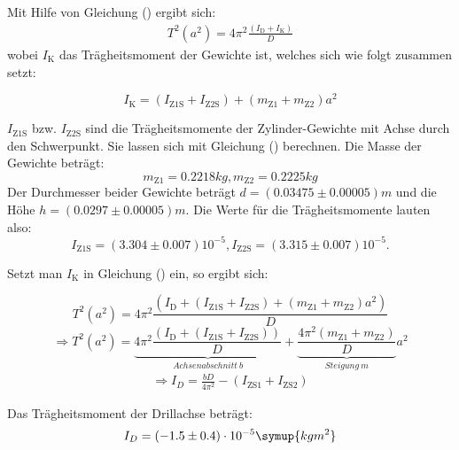 Mit Hilfe von Gleichung () ergibt sich:
\begin{align}
  T^2(a^2) = 4\pi^2\frac{(I_\text{D}+I_\text{K})}{D}
\end{align}
wobei $I_\text{K}$ das Trägheitsmoment der Gewichte ist, welches sich wie folgt zusammen setzt:

\begin{equation}
 I_\text{K} = (I_\text{Z1S}+I_\text{Z2S})+(m_\text{Z1}+m_\text{Z2})a^2
\end{equation}

$I_\text{Z1S}$ bzw. $I_\text{Z2S}$ sind die Trägheitsmomente der Zylinder-Gewichte mit Achse durch den Schwerpunkt.
Sie lassen sich mit Gleichung () berechnen. 
Die Masse der Gewichte beträgt:
\begin{equation}
m_\text{Z1} = 0.2218 kg , m_\text{Z2} = 0.2225 kg
\end{equation}
Der Durchmesser beider Gewichte beträgt $d = (0.03475 \pm 0.00005)m$ und die Höhe $h = (0.0297 \pm 0.00005)m$.
Die Werte für die Trägheitsmomente lauten also:
\begin{equation}
I_\text{Z1S} = (3.304 \pm 0.007)10^{-5} , I_\text{Z2S} = (3.315 \pm 0.007)10^{-5} .
\end{equation}

Setzt man $I_\text{K}$ in Gleichung () ein, so ergibt sich:

\begin{equation}
 T^2(a^2) = 4\pi^2\frac{(I_\text{D}+(I_\text{Z1S}+I_\text{Z2S})+(m_\text{Z1}+m_\text{Z2})a^2)}{D}
\end{equation}
\begin{equation}
 \Rightarrow T^2(a^2) = \underbrace{4\pi^2\frac{(I_\text{D}+(I_\text{Z1S}+I_\text{Z2S}))}{D}}_{Achsenabschnitt \: b} + \underbrace{\frac{4\pi^2(m_\text{Z1}+m_\text{Z2})}{D}}_{Steigung \: m} a^2
 \end{equation}
 \begin{align}
  \Rightarrow I_D = \frac{bD}{4\pi^2}-(I_\text{ZS1}+I_\text{ZS2})
 \end{align}

 Das Trägheitsmoment der Drillachse beträgt:
 \begin{equation}
 I_D= (-1.5 \pm 0.4) \cdot 10^{-5} \symup{kgm^2}
 \end{equation}



